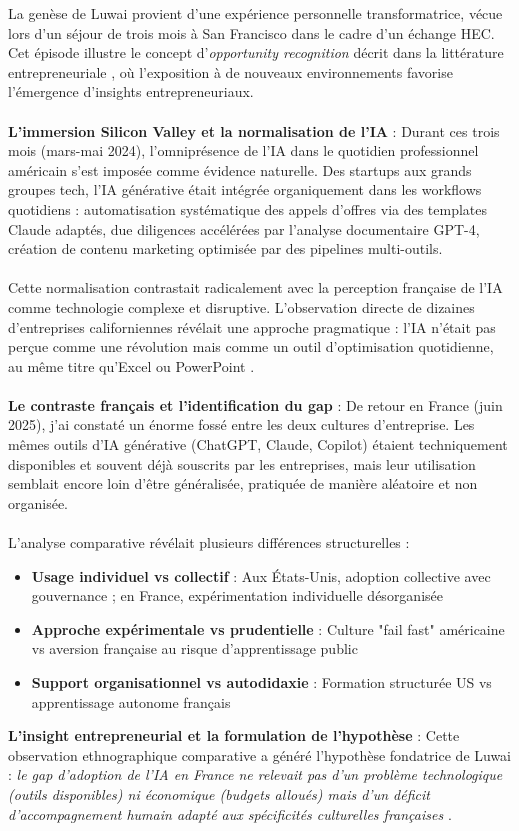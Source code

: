 La genèse de Luwai provient d'une expérience personnelle transformatrice, vécue lors d'un séjour de trois mois à San Francisco dans le cadre d'un échange HEC. Cet épisode illustre le concept d'\emph{opportunity recognition} décrit dans la littérature entrepreneuriale \cite{shane2000prior}, où l'exposition à de nouveaux environnements favorise l'émergence d'insights entrepreneuriaux.
\\\\
\textbf{L'immersion Silicon Valley et la normalisation de l'IA} : Durant ces trois mois (mars-mai 2024), l'omniprésence de l'IA dans le quotidien professionnel américain s'est imposée comme évidence naturelle. Des startups aux grands groupes tech, l'IA générative était intégrée organiquement dans les workflows quotidiens : automatisation systématique des appels d'offres via des templates Claude adaptés, due diligences accélérées par l'analyse documentaire GPT-4, création de contenu marketing optimisée par des pipelines multi-outils.
\\\\
Cette normalisation contrastait radicalement avec la perception française de l'IA comme technologie complexe et disruptive. L'observation directe de dizaines d'entreprises californiennes révélait une approche pragmatique : l'IA n'était pas perçue comme une révolution mais comme un outil d'optimisation quotidienne, au même titre qu'Excel ou PowerPoint \cite{mcafee2023productivity}.
\\\\
\textbf{Le contraste français et l'identification du gap} : De retour en France (juin 2025), j'ai constaté un énorme fossé entre les deux cultures d'entreprise. Les mêmes outils d'IA générative (ChatGPT, Claude, Copilot) étaient techniquement disponibles et souvent déjà souscrits par les entreprises, mais leur utilisation semblait encore loin d'être généralisée, pratiquée de manière aléatoire et non organisée.
\\\\
L'analyse comparative révélait plusieurs différences structurelles :
\begin{itemize}
    \item \textbf{Usage individuel vs collectif} : Aux États-Unis, adoption collective avec gouvernance ; en France, expérimentation individuelle désorganisée
    \item \textbf{Approche expérimentale vs prudentielle} : Culture "fail fast" américaine vs aversion française au risque d'apprentissage public
    \item \textbf{Support organisationnel vs autodidaxie} : Formation structurée US vs apprentissage autonome français
\end{itemize}
\medskip
\textbf{L'insight entrepreneurial et la formulation de l'hypothèse} : Cette observation ethnographique comparative a généré l'hypothèse fondatrice de Luwai : \emph{le gap d'adoption de l'IA en France ne relevait pas d'un problème technologique (outils disponibles) ni économique (budgets alloués) mais d'un déficit d'accompagnement humain adapté aux spécificités culturelles françaises} \cite{hofstede2001culture}.

